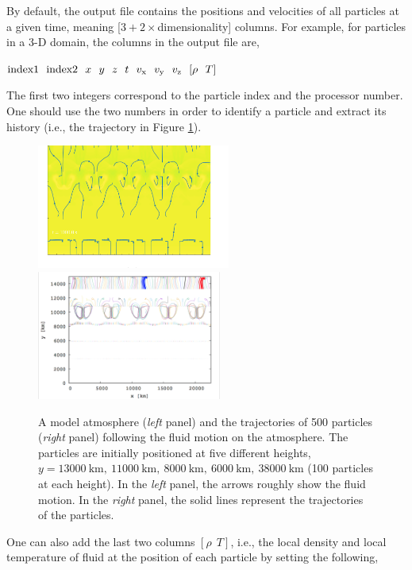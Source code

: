 \vspace{0.05in}
\noindent By default, the output file contains the positions and velocities of all particles at a given time, meaning [$3+ 2\times$dimensionality] columns. For example, for particles in a 3-D domain, the columns in the output file are, 

\vspace{0.1in}
${\rm index1}~~{\rm index2}~~x~~ y~~ z~~ t~~ v_{\rm x} ~~v_{\rm y}~~ v_{\rm z}~~ [\rho ~~ T]$
\vspace{0.1in}

\noindent The first two integers correspond to the particle index and the processor number. 
One should use the two numbers in order to identify a particle and extract its history (i.e., the trajectory in Figure \ref{fig:particletrajectory}). 

\begin{figure}[h]
	\centering
	\includegraphics[width=2.5in]{fluid_motion}
	\includegraphics[width=2.39in]{tracer_trajectory}
	\caption{A model atmosphere (\textit{left} panel) and the trajectories of 500 particles (\textit{right} panel) following the fluid motion on the atmosphere. The particles are initially positioned at five different heights, $y=13000\mathrm{~km},~11000\mathrm{~km},~ 8000\mathrm{~km},~ 6000\mathrm{~km}, ~38000\mathrm{~km}$ (100 particles at each height). In the \textit{left} panel, the arrows roughly show the fluid motion. In the \textit{right} panel, the solid lines represent the trajectories of the particles. }
	\label{fig:particletrajectory}
\end{figure}



\noindent One can also add the last two columns $[\rho ~~ T]$, i.e., the local density and local temperature of fluid at the position of each particle by setting the following,

